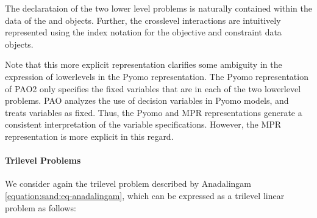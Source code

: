 \documentclass[letterpaper,10pt,english]{sphinxmanual}
\begin{document}
\begin{sphinxVerbatim}[commandchars=\\\{\}]
  
  
\end{sphinxVerbatim}

The declarataion of the two lower level problems is naturally contained
within the data of the  and  objects.  Further, the
cross\sphinxhyphen{}level interactions are intuitively represented using the index
notation for the objective and constraint data objects.

Note that this more explicit representation clarifies some ambiguity in
the expression of lower\sphinxhyphen{}levels in the Pyomo representation.  The Pyomo
representation of PAO2 only specifies the fixed variables that are
 in each of the two lower\sphinxhyphen{}level problems.  PAO analyzes
the use of decision variables in Pyomo models, and treats 
variables as fixed.  Thus, the Pyomo and MPR representations generate
a consistent interpretation of the variable specifications.  However,
the MPR representation is more explicit in this regard.


\paragraph{Trilevel Problems}
\label{\detokenize{representations/mpr:trilevel-problems}}
We consider again the trilevel problem described by Anadalingam
\eqref{equation:sand:eq-anadalingam}, which can be expressed as a trilevel linear problem
as follows:
\end{document}
